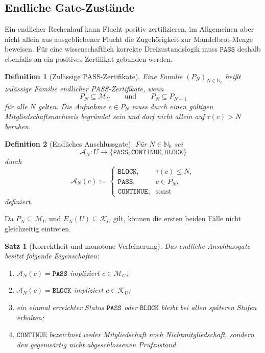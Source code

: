 \documentclass[11pt,a4paper]{article}
\newtheorem{definition}{Definition}[section]
\newtheorem{satz}{Satz}[section]
\theoremstyle{remark}
\newcommand{\M}{\mathcal{M}}
\newcommand{\K}{\mathcal{K}}
\newcommand{\N}{\mathbb{N}}
\newcommand{\PASS}{\texttt{PASS}}
\newcommand{\CONTINUE}{\texttt{CONTINUE}}
\newcommand{\BLOCK}{\texttt{BLOCK}}
\begin{document}
\subsection{Endliche Gate-Zustände}

Ein endlicher Rechenlauf kann Flucht positiv zertifizieren, im Allgemeinen
aber nicht allein aus ausgebliebener Flucht die Zugehörigkeit zur
Mandelbrot-Menge beweisen. Für eine wissenschaftlich korrekte
Dreizustandslogik muss \(\PASS\) deshalb ebenfalls an ein positives
Zertifikat gebunden werden.

\begin{definition}[Zulässige PASS-Zertifikate]
Eine Familie \((P_N)_{N\in\N_0}\) heißt zulässige Familie endlicher
PASS-Zertifikate, wenn
\[
  P_N\subseteq\M_U
  \qquad\text{und}\qquad
  P_N\subseteq P_{N+1}
\]
für alle \(N\) gelten. Die Aufnahme \(c\in P_N\) muss durch einen gültigen
Mitgliedschaftsnachweis begründet sein und darf nicht allein auf
\(\tau(c)>N\) beruhen.
\end{definition}

\begin{definition}[Endliches Anschlussgate]
Für \(N\in\N_0\) sei
\[
  \mathcal A_N:U\longrightarrow\{\PASS,\CONTINUE,\BLOCK\}
\]
durch
\[
  \mathcal A_N(c):=
  \begin{cases}
    \BLOCK,&\tau(c)\le N,\\
    \PASS,&c\in P_N,\\
    \CONTINUE,&\text{sonst}
  \end{cases}
\]
definiert.
\end{definition}

Da \(P_N\subseteq\M_U\) und \(E_N(U)\subseteq\K_U\) gilt, können die
ersten beiden Fälle nicht gleichzeitig eintreten.

\begin{satz}[Korrektheit und monotone Verfeinerung]
\label{satz:gate-korrektheit}
Das endliche Anschlussgate besitzt folgende Eigenschaften:
\begin{enumerate}
  \item \(\mathcal A_N(c)=\PASS\) impliziert \(c\in\M_U\);
  \item \(\mathcal A_N(c)=\BLOCK\) impliziert \(c\in\K_U\);
  \item ein einmal erreichter Status \(\PASS\) oder \(\BLOCK\) bleibt bei
        allen späteren Stufen erhalten;
  \item \(\CONTINUE\) bezeichnet weder Mitgliedschaft noch
        Nichtmitgliedschaft, sondern den gegenwärtig nicht abgeschlossenen
        Prüfzustand.
\end{enumerate}
\end{satz}
\end{document}
